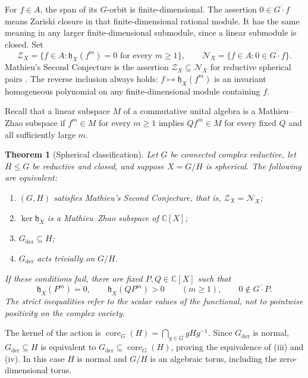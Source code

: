 \documentclass[11pt]{article}
\numberwithin{equation}{section}
\newtheorem{theorem}{Theorem}[section]
\theoremstyle{definition}
\theoremstyle{remark}
\newcommand{\C}{\mathbb C}
\newcommand{\hX}{\mathfrak h_X}
\DeclareMathOperator{\core}{core}
\newcommand{\der}{\mathrm{der}}
\begin{document}
For $f\in A$, the span of its $G$-orbit is finite-dimensional. The assertion $0\in\overline{G\cdot f}$ means Zariski closure in that finite-dimensional rational module. It has the same meaning in any larger finite-dimensional submodule, since a linear submodule is closed. Set
\[
 \mathcal Z_X=\{f\in A:\hX(f^m)=0\text{ for every }m\geq1\},
 \qquad
 \mathcal N_X=\{f\in A:0\in\overline{G\cdot f}\}.
\]
Mathieu's Second Conjecture is the assertion $\mathcal Z_X\subseteq\mathcal N_X$ for reductive spherical pairs \cite[p.~264]{Mathieu}. The reverse inclusion always holds: $f\mapsto\hX(f^m)$ is an invariant homogeneous polynomial on any finite-dimensional module containing $f$.

Recall that a linear subspace $M$ of a commutative unital algebra is a Mathieu--Zhao subspace if $f^m\in M$ for every $m\geq1$ implies $Qf^m\in M$ for every fixed $Q$ and all sufficiently large $m$.

\begin{theorem}[Spherical classification]\label{thm:main}
Let $G$ be connected complex reductive, let $H\leq G$ be reductive and closed, and suppose $X=G/H$ is spherical. The following are equivalent:
\begin{enumerate}[label=\textup{(\roman*)},itemsep=2pt,topsep=4pt]
\item $(G,H)$ satisfies Mathieu's Second Conjecture, that is, $\mathcal Z_X=\mathcal N_X$;
\item $\ker\hX$ is a Mathieu--Zhao subspace of $\C[X]$;
\item $G_{\der}\subseteq H$;
\item $G_{\der}$ acts trivially on $G/H$.
\end{enumerate}
If these conditions fail, there are fixed $P,Q\in\C[X]$ such that
\begin{equation}\label{eq:negative}
 \hX(P^m)=0,\qquad \hX(QP^m)>0\qquad(m\geq1),
 \qquad 0\notin\overline{G\cdot P}.
\end{equation}
The strict inequalities refer to the scalar values of the functional, not to pointwise positivity on the complex variety.
\end{theorem}

The kernel of the action is $\core_G(H)=\bigcap_{g\in G}gHg^{-1}$. Since $G_{\der}$ is normal, $G_{\der}\subseteq H$ is equivalent to $G_{\der}\subseteq\core_G(H)$, proving the equivalence of (iii) and (iv). In this case $H$ is normal and $G/H$ is an algebraic torus, including the zero-dimensional torus.
\end{document}
